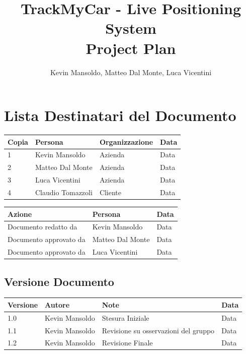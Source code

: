 \documentclass[a4paper,12pt]{article}
\begin{document}
\title{\textbf{TrackMyCar - Live Positioning System}\\Project Plan}

\author{Kevin Mansoldo, Matteo Dal Monte, Luca Vicentini}
\date{}
\maketitle
\pagebreak

\tableofcontents
\pagebreak

\section{Lista Destinatari del Documento}

\begin{table}[ht]
\begin{center}
\begin{tabular}{p{1cm} p{4.5cm} p{5cm} p{2cm}}
\rowcolor{Ash}
\hline
Copia & Persona & Organizzazione & Data \\ \hline
1 & Kevin Mansoldo & Azienda & Data \\ 
2 & Matteo Dal Monte & Azienda & Data \\ 
3 & Luca Vicentini & Azienda & Data \\ 
4 & Claudio Tomazzoli & Cliente & Data \\ \hline
\end{tabular}
\end{center}


\begin{center}
\begin{tabular}{p{6cm} p{5cm} p{2cm}}
\rowcolor{Ash}
\hline
Azione & Persona & Data \\ \hline
Documento redatto da & Kevin Mansoldo & Data \\ 
Documento approvato da & Matteo Dal Monte & Data \\ 
Documento approvato da & Luca Vicentini & Data \\ \hline
\end{tabular}
\end{center}
\end{table}

\subsection{Versione Documento}
\begin{table}[ht]
\begin{center}
\begin{tabular}{p{1cm} p{4.5cm} p{5cm} p{2cm}}
\rowcolor{Ash}
\hline
Versione & Autore & Note & Data \\ \hline
1.0 & Kevin Mansoldo & Stesura Iniziale & Data \\ 
1.1 & Kevin Mansoldo & Revisione su osservazioni del gruppo & Data \\ 
1.2 & Kevin Mansoldo & Revisione Finale & Data \\ \hline
\end{tabular}
\end{center}
\end{table}
\end{document}
